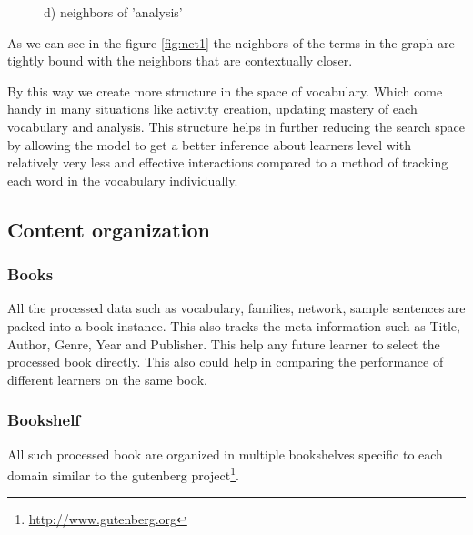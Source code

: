 \documentclass[11pt,a4paper]{article}
\begin{document}
\begin{figure}[h!]
\begin{center}
\caption{d) neighbors of 'analysis' }

\end{center}
\end{figure}

As we can see in the figure \ref{fig:net1} the neighbors of the terms in the
graph are tightly bound with the neighbors that are contextually closer.

By this way we create more structure in the space of vocabulary. Which come
handy in many situations like activity creation, updating mastery of each
vocabulary and analysis. This structure helps in further reducing the search space
by allowing the model to get a better inference about learners level with
relatively very less and effective interactions compared to a method of
tracking each word in the vocabulary individually.


\subsection{Content organization}
\subsubsection{Books}
All the processed data such as vocabulary, families, network, sample sentences
are packed into a book instance. This also tracks the meta information such as
Title, Author, Genre, Year and Publisher. This help any future learner to select
the processed book directly. This also could help in comparing the performance
of different learners on the same book.

\subsubsection{Bookshelf}
All such processed book are organized in multiple bookshelves specific to each
domain similar to the gutenberg project\footnote{\url{http://www.gutenberg.org}}.
\end{document}
